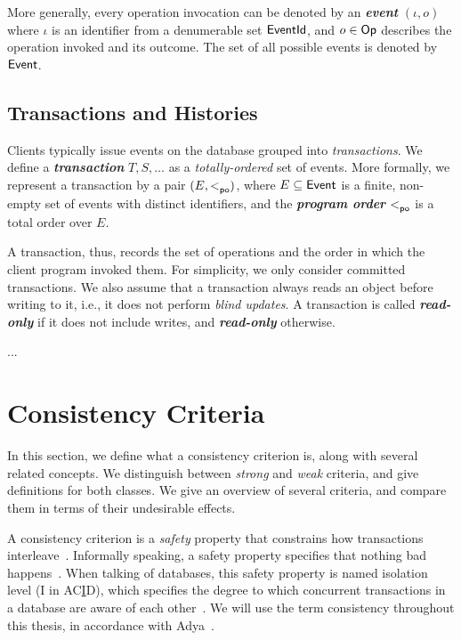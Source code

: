 More generally, every operation invocation can be denoted by an {\bf\em event} $(\iota, o)$ where $\iota$ is an identifier from a denumerable set ${\sf EventId}$, and $o \in {\sf Op}$ describes the operation invoked and its outcome. The set of all possible events is denoted by ${\sf Event}$.

\subsection{Transactions and Histories}


Clients typically issue events on the database grouped into \emph{transactions}. We define a \textbf{\em transaction} $T, S, \dots$ as a \emph{totally-ordered} set of events. More formally, we represent a transaction by a pair $( E ,{ <^{}_{{\sf po}} })$, where $E \subseteq {\sf Event}$ is a finite, non-empty set of events with distinct identifiers, and the \textbf{\em program order} $<^{}_{{\sf po}}$ is a total order over $E$.

A transaction, thus, records the set of operations and the order in which the client program invoked them. For simplicity, we only consider committed transactions. We also assume that a transaction always reads an object before writing to it, i.e., it does not perform \emph{blind updates}. A transaction is called \textbf{\em read-only} if it does not include writes, and \textbf{\em read-only} otherwise.

... 

\section{Consistency Criteria}

In this section, we define what a consistency criterion is, along with several related concepts. We distinguish between \emph{strong} and \emph{weak} criteria, and give definitions for both classes. We give an overview of several criteria, and compare them in terms of their undesirable effects.

A consistency criterion is a \emph{safety} property that constrains how transactions interleave~\citep{ardekani_thesis}. Informally speaking, a safety property specifies that nothing bad happens~\citep{lamport_safety}. When talking of databases, this safety property is named isolation level (I in AC\underline{I}D), which specifies the degree to which concurrent transactions in a database are aware of each other~\citep{adya_thesis}. We will use the term consistency throughout this thesis, in accordance with Adya~\citep{adya_thesis}.

